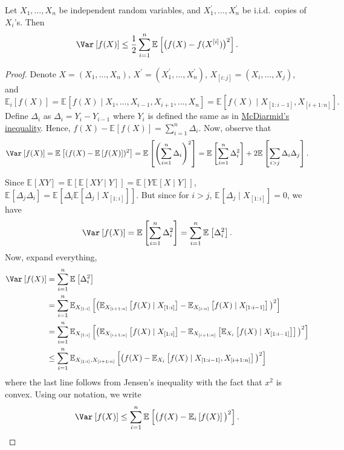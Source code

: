 \begin{theorem}\label{pf-thm:Efron-Stein-inequality}
	Let \(X_1, \dots , X_n\) be independent random variables, and \(X_1^{\prime} , \dots , X_n^{\prime} \) be i.i.d.\ copies of \(X_i\)'s. Then
	\[
		\Var_{}\left[f(X) \right] \leq \frac{1}{2} \sum_{i=1}^{n} \mathbb{E}_{}\left[\big(f(X) - f(X^{[i]}) \big)^2 \right].
	\]
\end{theorem}
\begin{proof}
	Denote \(X = (X_1, \dots , X_n)\), \(X^{\prime} = (X_1^{\prime} , \dots , X_n^{\prime} )\), \(X_{[i:j]} = (X_i, \dots , X_j)\), and
	\[
		\mathbb{E}_{i}\left[f(X) \right]
		= \mathbb{E}_{}\left[f(X) \mid X_1, \dots , X_{i-1}, X_{i+1}, \dots , X_n \right]
		= \mathbb{E}_{}\left[f(X) \mid X_{[1:i-1]}, X_{[i+1:n]} \right] .
	\]
	Define \(\Delta _i\) as \(\Delta _i = Y_i - Y_{i-1} \) where \(Y_i\) is defined the same as in \hyperref[pf-thm:McDiarmid-inequality]{McDiarmid's inequality}. Hence, \(f(X) - \mathbb{E}_{}\left[f(X) \right] = \sum_{i=1}^{n} \Delta _i\). Now, observe that
	\[
		\Var_{}\left[f(X) \right]
		= \mathbb{E}_{}\left[(f(X) - \mathbb{E}_{}\left[f(X) \right] )^2 \right]
		= \mathbb{E}_{}\left[\left( \sum_{i=1}^{n} \Delta _i \right) ^2 \right]
		= \mathbb{E}_{}\left[\sum_{i=1}^{n} \Delta _i ^2 \right] + 2 \mathbb{E}_{}\left[\sum_{i > j} \Delta _i \Delta _j \right] .
	\]

	Since \(\mathbb{E}_{}\left[XY \right] = \mathbb{E}_{}\left[\mathbb{E}_{}\left[XY \mid Y \right] \right] = \mathbb{E}_{}\left[Y \mathbb{E}_{}\left[X \mid Y \right] \right] \), \(\mathbb{E}_{}\left[\Delta _j \Delta _i \right] = \mathbb{E}_{}\left[\Delta _i \mathbb{E}_{}\left[\Delta _j \mid X_{[1:i]} \right] \right] \). But since for \(i > j\), \(\mathbb{E}_{}\left[\Delta _j \mid X_{[1:i]} \right] = 0\), we have
	\[
		\Var_{}\left[f(X) \right] = \mathbb{E}_{}\left[\sum_{i=1}^{n} \Delta _i^2 \right] = \sum_{i=1}^{n} \mathbb{E}_{}\left[\Delta _i^2 \right] .
	\]
	Now, expand everything,
	\[
		\begin{split}
			\Var_{}\left[f(X) \right]
			&= \sum_{i=1}^{n} \mathbb{E}_{}\left[\Delta _i^2 \right] \\
			&= \sum_{i=1}^{n} \mathbb{E}_{X_{[1:i]}}\left[\big( \mathbb{E}_{X_{[i+1:n]}}\left[f(X) \mid X_{[1:i]} \right] - \mathbb{E}_{X_{[i:n]}}\left[f(X) \mid X_{[1:i-1]} \right] \big)^2 \right] \\
			&= \sum_{i=1}^{n} \mathbb{E}_{X_{[1:i]}}\left[ \big( \mathbb{E}_{X_{[i+1:n]}}\left[f(X) \mid X_{[1:i]} \right] - \mathbb{E}_{X_{[i+1:n]}}\left[ \mathbb{E}_{X_i}\left[f(X) \mid X_{[1:i-1]} \right] \right] \big)^2 \right]\\
			&\leq \sum_{i=1}^{n} \mathbb{E}_{X_{[1:i]}, X_{[i+1:n]}}\left[\big( f(X) - \mathbb{E}_{X_i}\left[f(X) \mid X_{[1:i-1]}, X_{[i+1:n]} \right] \big)^2 \right]
		\end{split}
	\]
	where the last line follows from Jensen's inequality with the fact that \(x^2\) is convex. Using our notation, we write
	\[
		\Var_{}\left[f(X) \right] \leq \sum_{i=1}^{n} \mathbb{E}_{}\left[\big(f(X) - \mathbb{E}_{i}\left[f(X) \right] \big)^2\right] .
	\]


\end{proof}
